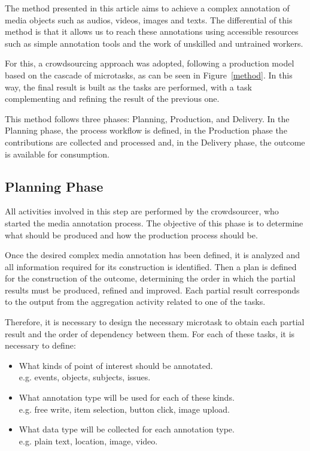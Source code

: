 The method presented in this article aims to achieve a complex annotation of media objects such as audios, videos, images and texts. The differential of this method is that it allows us to reach these annotations using accessible resources such as simple annotation tools and the work of unskilled and untrained workers.

For this, a crowdsourcing approach was adopted, following a production model based on the cascade of microtasks, as can be seen in Figure~\ref{method}. In this way, the final result is built as the tasks are performed, with a task complementing and refining the result of the previous one.

This method follows three phases: Planning, Production, and Delivery. In the Planning phase, the process workflow is defined, in the Production phase the contributions are collected and processed and, in the Delivery phase, the outcome is available for consumption.

\subsection{Planning Phase} 
All activities involved in this step are performed by the crowdsourcer, who started the media annotation process. The objective of this phase is to determine what should be produced and how the production process should be.

Once the desired complex media annotation has been defined, it is analyzed and all information required for its construction is identified. Then a plan is defined for the construction of the outcome, determining the order in which the partial results must be produced, refined and improved. Each partial result corresponds to the output from the aggregation activity related to one of the tasks.

Therefore, it is necessary to design the necessary microtask to obtain each partial result and the order of dependency between them. For each of these tasks, it is necessary to define:
\begin{itemize}
\item What kinds of point of interest should be annotated.\\e.g. events, objects, subjects, issues.
\item What annotation type will be used for each of these kinds.\\e.g. free write, item selection, button click, image upload.
\item What data type will be collected for each annotation type.\\e.g. plain text, location, image, video.
\end{itemize}

